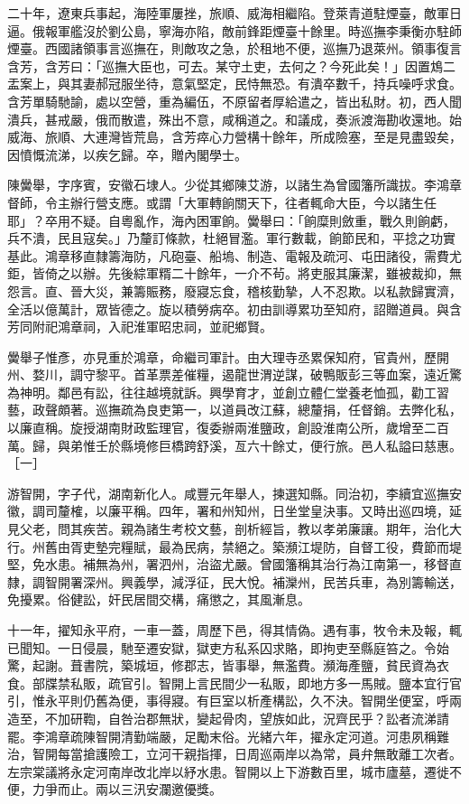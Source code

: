 \begin{pinyinscope}
二十年，遼東兵事起，海陸軍屢挫，旅順、威海相繼陷。登萊青道駐煙臺，敵軍日逼。俄報軍艦沒於劉公島，寧海亦陷，敵前鋒距煙臺十餘里。時巡撫李秉衡亦駐師煙臺。西國諸領事言巡撫在，則敵攻之急，於租地不便，巡撫乃退萊州。領事復言含芳，含芳曰：「巡撫大臣也，可去。某守土吏，去何之？今死此矣！」因置鴆二盂案上，與其妻郝冠服坐待，意氣堅定，民恃無恐。有潰卒數千，持兵噪呼求食。含芳單騎馳諭，處以空營，重為編伍，不原留者厚給遣之，皆出私財。初，西人聞潰兵，甚戒嚴，俄而散遣，殊出不意，咸稱道之。和議成，奏派渡海勘收還地。始威海、旅順、大連灣皆荒島，含芳瘁心力營構十餘年，所成險塞，至是見盡毀矣，因憤慨流涕，以疾乞歸。卒，贈內閣學士。

陳黌舉，字序賓，安徽石埭人。少從其鄉陳艾游，以諸生為曾國籓所識拔。李鴻章督師，令主辦行營支應。或謂「大軍轉餉關天下，往者輒命大臣，今以諸生任耶」？卒用不疑。自粵亂作，海內困軍餉。黌舉曰：「餉糜則斂重，戰久則餉虧，兵不潰，民且寇矣。」乃釐訂條款，杜絕冒濫。軍行數載，餉節民和，平捻之功實基此。鴻章移直隸籌海防，凡砲臺、船塢、制造、電報及疏河、屯田諸役，需費尤鉅，皆倚之以辦。先後綜軍糈二十餘年，一介不茍。將吏服其廉潔，雖被裁抑，無怨言。直、晉大災，兼籌賑務，廢寢忘食，稽核勤摯，人不忍欺。以私款歸實濟，全活以億萬計，眾皆德之。旋以積勞病卒。初由訓導累功至知府，詔贈道員。與含芳同附祀鴻章祠，入祀淮軍昭忠祠，並祀鄉賢。

黌舉子惟彥，亦見重於鴻章，命繼司軍計。由大理寺丞累保知府，官貴州，歷開州、婺川，調守黎平。首革票差催糧，遏龍世渭逆謀，破鴨販彭三等血案，遠近驚為神明。鄰邑有訟，往往越境就訴。興學育才，並創立體仁堂養老恤孤，勸工習藝，政聲頗著。巡撫疏為良吏第一，以道員改江蘇，總釐捐，任督銷。去弊化私，以廉直稱。旋授湖南財政監理官，復委辦兩淮鹽政，創設淮南公所，歲增至二百萬。歸，與弟惟壬於縣境修巨橋跨舒溪，亙六十餘丈，便行旅。邑人私謚曰慈惠。［一］

游智開，字子代，湖南新化人。咸豐元年舉人，揀選知縣。同治初，李續宜巡撫安徽，調司釐榷，以廉平稱。四年，署和州知州，日坐堂皇決事。又時出巡四境，延見父老，問其疾苦。親為諸生考校文藝，剖析經旨，教以孝弟廉讓。期年，治化大行。州舊由胥吏墊完糧賦，最為民病，禁絕之。築瀕江堤防，自督工役，費節而堤堅，免水患。補無為州，署泗州，治盜尤嚴。曾國籓稱其治行為江南第一，移督直隸，調智開署深州。興義學，減浮征，民大悅。補灤州，民苦兵車，為別籌輸送，免擾累。俗健訟，奸民居間交構，痛懲之，其風漸息。

十一年，擢知永平府，一車一蓋，周歷下邑，得其情偽。遇有事，牧令未及報，輒已聞知。一日侵晨，馳至遷安獄，獄吏方私系囚求賂，即拘吏至縣庭笞之。令始驚，起謝。葺書院，築城垣，修郡志，皆事舉，無濫費。瀕海產鹽，貧民資為衣食。部牒禁私販，疏官引。智開上言民間少一私販，即地方多一馬賊。鹽本宜行官引，惟永平則仍舊為便，事得寢。有巨室以析產構訟，久不決。智開坐便室，呼兩造至，不加研鞫，自咎治郡無狀，變起骨肉，望族如此，況齊民乎？訟者流涕請罷。李鴻章疏陳智開清勤端嚴，足勵末俗。光緒六年，擢永定河道。河患夙稱難治，智開每當搶護險工，立河干親指揮，日周巡兩岸以為常，員弁無敢離工次者。左宗棠議將永定河南岸改北岸以紓水患。智開以上下游數百里，城市廬墓，遷徙不便，力爭而止。兩以三汛安瀾邀優獎。


\end{pinyinscope}

